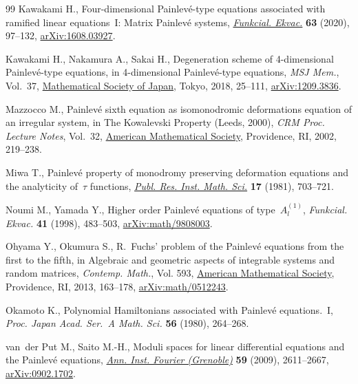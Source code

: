 \documentclass[pdftex]{sigma}
\numberwithin{equation}{section}
\begin{document}
\begin{thebibliography}{99}
Kawakami H., Four-dimensional {P}ainlev\'e-type equations associated with
 ramified linear equations~{I}: {M}atrix {P}ainlev\'e systems,
 \href{https://doi.org/10.1619/fesi.63.97}{\textit{Funkcial. Ekvac.}}
 \textbf{63} (2020), 97--132,
 \href{http://arxiv.org/abs/1608.03927}{arXiv:1608.03927}.

Kawakami H., Nakamura A., Sakai H., Degeneration scheme of 4-dimensional
 {P}ainlev\'e-type equations, in 4-dimensional {P}ainlev\'e-type equations,
 \textit{MSJ Mem.}, Vol.~37,
 \href{https://doi.org/10.2969/msjmemoirs/03701C020}{Mathematical Society of
 Japan}, Tokyo, 2018, 25--111,
 \href{http://arxiv.org/abs/1209.3836}{arXiv:1209.3836}.

Mazzocco M., Painlev\'e sixth equation as isomonodromic deformations equation
 of an irregular system, in The {K}owalevski {P}roperty ({L}eeds, 2000),
 \textit{CRM Proc. Lecture Notes}, Vol.~32,
 \href{https://doi.org/10.1090/crmp/032/12}{American Mathematical Society},
 Providence, RI, 2002, 219--238.

Miwa T., Painlev\'e property of monodromy preserving deformation equations and
 the analyticity of~{$\tau $} functions,
 \href{https://doi.org/10.2977/prims/1195185270}{\textit{Publ. Res. Inst.
 Math. Sci.}} \textbf{17} (1981), 703--721.

Noumi M., Yamada Y., Higher order {P}ainlev\'e equations of type~{$A^{(1)}_l$},
 \textit{Funkcial. Ekvac.} \textbf{41} (1998), 483--503,
 \href{http://arxiv.org/abs/math/9808003}{arXiv:math/9808003}.

Ohyama Y., Okumura S., R.~{F}uchs' problem of the {P}ainlev\'e equations from
 the first to the fifth, in Algebraic and geometric aspects of integrable
 systems and random matrices, \textit{Contemp. Math.}, Vol. 593,
 \href{https://doi.org/10.1090/conm/593/11876}{American Mathematical Society}, Providence, RI, 2013, 163--178,
 \href{http://arxiv.org/abs/math/0512243}{arXiv:math/0512243}.

Okamoto K., Polynomial {H}amiltonians associated with {P}ainlev\'e
 equations.~{I}, \textit{Proc. Japan Acad. Ser.~A Math. Sci.} \textbf{56}
 (1980), 264--268.

van~der Put M., Saito M.-H., Moduli spaces for linear differential equations and
 the {P}ainlev\'e equations,
 \href{https://doi.org/10.5802/aif.2502}{\textit{Ann. Inst. Fourier
 (Grenoble)}} \textbf{59} (2009), 2611--2667,
 \href{http://arxiv.org/abs/0902.1702}{arXiv:0902.1702}.


\end{thebibliography}
\end{document}
